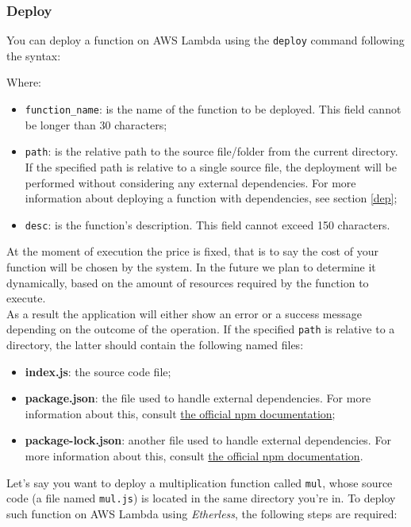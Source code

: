 \subsubsection{Deploy}\label{deploy}
You can deploy a function on AWS Lambda using the \texttt{deploy} command following the syntax:
\begin{center}
\end{center}
\noindent Where:
\begin{itemize}
	\item \texttt{function\_name}: is the name of the function to be deployed. This field cannot be longer than 30 characters;
	\item \texttt{path}: is the relative path to the source file/folder from the current directory. If the specified path is relative to a single source file, the deployment will be performed without considering any external dependencies. For more information about deploying a function with dependencies, see section \ref{dep};
	\item \texttt{desc}: is the function's description. This field cannot exceed 150 characters.
\end{itemize}
At the moment of execution the price is fixed, that is to say the cost of your function will be chosen by the system. In the future we plan to determine it dynamically, based on the amount of resources required by the function to execute. \\
As a result the application will either show an error or a success message depending on the outcome of the operation.
\label{dep}
If the specified \texttt{path} is relative to a directory, the latter should contain the following named files:
\begin{itemize}
\item \textbf{index.js}: the source code file;
\item \textbf{package.json}: the file used to handle external dependencies. For more information about this, consult \href{https://docs.npmjs.com/files/package.json}{the official npm documentation};
\item \textbf{package-lock.json}: another file used to handle external dependencies. For more information about this, consult \href{https://docs.npmjs.com/configuring-npm/package-lock-json.html}{the official npm documentation}.
\end{itemize}
Let's say you want to deploy a multiplication function called \texttt{mul}, whose source code (a file named \texttt{mul.js}) is located in the same directory you're in. To deploy such function on AWS Lambda using \textit{Etherless}, the following steps are required:
